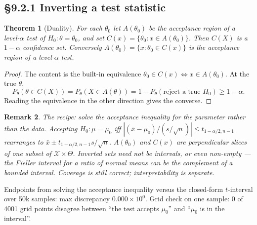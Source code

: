 \documentclass[11pt]{article}
\newtheorem{theorem}{Theorem}[section]
\newtheorem{remark}[theorem]{Remark}
\begin{document}
\subsection{\S9.2.1 Inverting a test statistic}
\begin{theorem}[Duality]
For each $\theta_0$ let $A(\theta_0)$ be the acceptance region of a level-$\alpha$ test of $H_0:\theta=\theta_0$, and set $C(x)=\{\theta_0:x\in A(\theta_0)\}$. Then $C(X)$ is a $1-\alpha$ confidence set. Conversely $A(\theta_0)=\{x:\theta_0\in C(x)\}$ is the acceptance region of a level-$\alpha$ test.
\end{theorem}
\begin{proof}
The content is the built-in equivalence $\theta_0\in C(x)\iff x\in A(\theta_0)$. At the true $\theta$,
\[P_\theta(\theta\in C(X))=P_\theta(X\in A(\theta))=1-P_\theta(\text{reject a true }H_0)\ge1-\alpha.\]
Reading the equivalence in the other direction gives the converse.
\end{proof}
\begin{remark}
The recipe: solve the acceptance inequality for the parameter rather than the data. Accepting $H_0:\mu=\mu_0$ iff $|(\bar x-\mu_0)/(s/\sqrt n)|\le t_{1-\alpha/2,n-1}$ rearranges to $\bar x\pm t_{1-\alpha/2,n-1}s/\sqrt n$. $A(\theta_0)$ and $C(x)$ are perpendicular slices of one subset of $\mathcal X\times\Theta$. Inverted sets need not be intervals, or even non-empty --- the Fieller interval for a ratio of normal means can be the complement of a bounded interval. Coverage is still correct; interpretability is separate.
\end{remark}
\begin{simbox}
Endpoints from solving the acceptance inequality versus the closed-form $t$-interval over 50k samples: max discrepancy $0.000\times10^{0}$. Grid check on one sample: 0 of 4001 grid points disagree between ``the test accepts $\mu_0$'' and ``$\mu_0$ is in the interval''.
\end{simbox}
\end{document}
